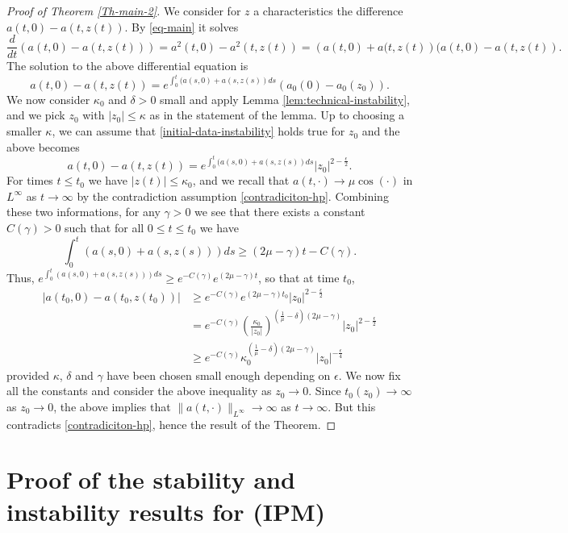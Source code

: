 \documentclass[12pt]{amsart}
\numberwithin{equation}{section}
\numberwithin{equation}{section}
\begin{document}
\begin{proof}[Proof of Theorem \ref{Th-main-2}]

We consider for $z$ a characteristics the difference $a(t,0)-a(t,z(t))$. By \eqref{eq-main} it solves
$$
\frac{d}{dt}\left(a(t,0)-a(t,z(t)) \right)=a^2(t,0)-a^2(t,z(t))=\left(a(t,0)+a(t,z(t)\right)(a(t, 0)-a(t,  z(t)).
$$
The solution to the above differential equation is
$$
a(t,0)-a(t,z(t))= e^{\int_0^t (a(s,0)+a(s,z(s))ds} (a_0(0)-a_0(z_0)).
$$
We now consider $\kappa_0$ and $\delta>0$ small and apply Lemma \ref{lem:technical-instability}, and we pick $z_0$ with $|z_0|\leq \kappa$ as in the statement of the lemma. Up to choosing a smaller $\kappa$, we can assume that \eqref{initial-data-instability} holds true for $z_0$ and the above becomes
$$
a(t,0)-a(t,z(t))= e^{\int_0^t (a(s,0)+a(s,z(s))ds} |z_0|^{2-\frac{\epsilon}{2}}.
$$
For times $t\leq t_0$ we have $|z(t)|\leq \kappa_0$, and we recall that $a(t, \cdot)\to \mu \cos(\cdot)$ in $L^\infty$ as $t\to \infty$ by the contradiction assumption \eqref{contradiciton-hp}. Combining these two informations, for any $\gamma>0$ we see that there exists a constant $C(\gamma)>0$ such that for all $0\leq t\leq t_0$ we have
$$
\int_0^t \left(a(s,0)+a(s,z(s))\right)ds\geq (2\mu-\gamma)t  -C(\gamma).
$$
Thus, $e^{\int_0^t (a(s,0)+a(s,z(s)))ds}\geq e^{-C(\gamma)} e^{(2\mu-\gamma)t}$, so that at time $t_0$,
\begin{align}
\nonumber \left|a(t_0,0)-a(t_0,z(t_0))\right| & \geq e^{-C(\gamma)} e^{(2\mu-\gamma)t_0} |z_0|^{2-\frac{\epsilon}{2}} \\
\nonumber & = e^{-C(\gamma)} \left(\frac{\kappa_0}{|z_0|} \right)^{(\frac{1}{\mu}-\delta)(2\mu-\gamma)} |z_0|^{2-\frac{\epsilon}{2}} \\
\label{id:instability:main-computation}& \geq e^{-C(\gamma)} \kappa_0^{(\frac{1}{\mu}-\delta)(2\mu-\gamma)}  |z_0|^{-\frac{\epsilon}{4}}
\end{align}
provided $\kappa$, $\delta$ and $\gamma$ have been chosen small enough depending on $\epsilon$.  We now fix all the constants and consider the above inequality as $z_0\to 0$. Since $t_0(z_0)\to \infty$ as $z_0\to 0$, the above implies that $\| a(t,\cdot)\|_{L^\infty}\to \infty$ as $t\to \infty$. But this contradicts \eqref{contradiciton-hp}, hence the result of the Theorem.
\end{proof}
 
 


\section{Proof of the stability and instability results for (IPM)} \label{sec:IPM-results}
\end{document}
